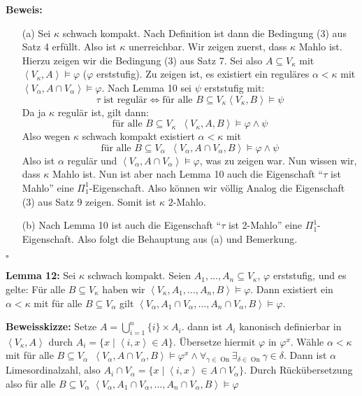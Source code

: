 \documentclass[a4paper,fontsize=11pt]{scrartcl}
\newcommand{\On}{\operatorname{On}}
\begin{document}
{\bf Beweis:}
\begin{itemize}
\item[(a)] Sei $\kappa$ schwach kompakt. Nach Definition ist dann die
  Bedingung (3) aus Satz 4 erfüllt. Also ist $\kappa$
  unerreichbar. Wir zeigen zuerst, dass $\kappa$ Mahlo ist. Hierzu
  zeigen wir die Bedingung (3) aus Satz 7. Sei also $A\subseteq
  V_\kappa$ mit $\left<V_\kappa,A\right>\models\varphi$ ($\varphi$
  erststufig). Zu zeigen ist, es existiert ein reguläres
  $\alpha<\kappa$ mit $\left<V_\alpha,A\cap
  V_\alpha\right>\models\varphi$. Nach Lemma 10 sei $\psi$ erststufig
  mit:
  $$ \tau\mbox{ ist regulär}\Leftrightarrow\mbox{für alle }B\subseteq
  V_\kappa\left<V_\kappa,B\right>\models\psi$$
  Da ja $\kappa$ regulär ist, gilt dann:
  $$ \mbox{für alle }B\subseteq
  V_\kappa\phantom{a}\left<V_\kappa,A,B\right>\models\varphi\wedge\psi$$
  Also wegen $\kappa$ schwach kompakt existiert $\alpha<\kappa$ mit
  $$ \mbox{für alle }B\subseteq
  V_\alpha\phantom{a}\left<V_\alpha,A\cap
  V_\alpha,B\right>\models\varphi\wedge\psi$$ Also ist $\alpha$
  regulär und $\left<V_\alpha,A\cap V_\alpha\right>\models\varphi$,
  was zu zeigen war. Nun wissen wir, dass $\kappa$ Mahlo ist. Nun ist
  aber nach Lemma 10 auch die Eigenschaft ``$\tau$ ist Mahlo'' eine
  $\Pi_1^1$-Eigenschaft. Also können wir völlig Analog die Eigenschaft
  (3) aus Satz 9 zeigen. Somit ist $\kappa$ $2$-Mahlo.
\item[(b)] Nach Lemma 10 ist auch die Eigenschaft ``$\tau$ ist
  2-Mahlo'' eine $\Pi_1^1$-Eigenschaft. Also folgt die Behauptung aus
  (a) und Bemerkung.
\end{itemize}

\hfill $\square$

{\bf Lemma 12:} Sei $\kappa$ schwach kompakt. Seien
$A_1,\ldots,A_n\subseteq V_\kappa$, $\varphi$ erststufig, und es
gelte: Für alle $B\subseteq V_\kappa$ haben wir
$\left<V_\kappa,A_1,\ldots,A_n,B\right>\models\varphi$. Dann existiert
ein $\alpha<\kappa$ mit für alle $B\subseteq V_\alpha$ gilt
$\left<V_\alpha,A_1\cap V_\alpha,\ldots,A_n\cap
V_\alpha,B\right>\models\varphi$.

{\bf Beweisskizze:} Setze $A=\bigcup_{i=1}^{n}\{i\}\times A_i$. dann
ist $A_i$ kanonisch definierbar in $\left<V_\kappa,A\right>$ durch
$A_i=\{x\mid\left<i,x\right>\in A\}$. Übersetze hiermit $\varphi$ in
$\varphi^x$. Wähle $\alpha<\kappa$ mit für alle $B\subseteq
V_\alpha\phantom{a}\left<V_\alpha,A\cap
V_\alpha,B\right>\models\varphi^x \wedge
\forall_{\gamma\in\On}\exists_{\delta\in\On}\gamma\in\delta$. Dann ist
$\alpha$ Limesordinalzahl, also $A_i\cap
V_\alpha=\{x\mid\left<i,x\right>\in A\cap V_\alpha\}$. Durch
Rückübersetzung also für alle $B\subseteq V_\alpha$
$\left<V_\alpha,A_1\cap V_\alpha,\ldots,A_n\cap
V_\alpha,B\right>\models\varphi$
\end{document}
